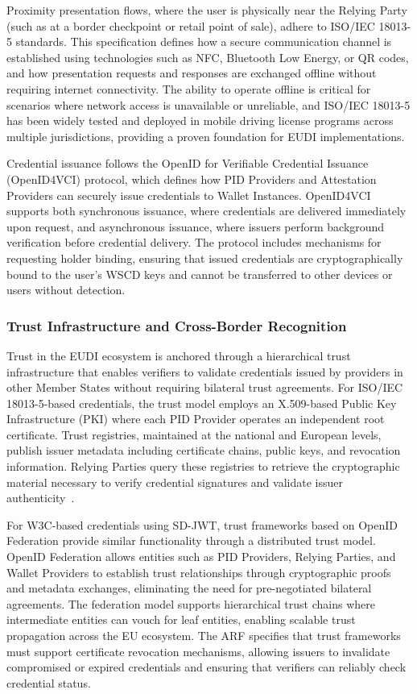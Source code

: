 \documentclass[sigconf,balance,nonacm,authordraft]{acmart}
\begin{document}
Proximity presentation flows, where the user is physically near the Relying Party (such as at a border checkpoint or retail point of sale), adhere to ISO/IEC 18013-5 standards. This specification defines how a secure communication channel is established using technologies such as NFC, Bluetooth Low Energy, or QR codes, and how presentation requests and responses are exchanged offline without requiring internet connectivity. The ability to operate offline is critical for scenarios where network access is unavailable or unreliable, and ISO/IEC 18013-5 has been widely tested and deployed in mobile driving license programs across multiple jurisdictions, providing a proven foundation for EUDI implementations.

Credential issuance follows the OpenID for Verifiable Credential Issuance (OpenID4VCI) protocol, which defines how PID Providers and Attestation Providers can securely issue credentials to Wallet Instances. OpenID4VCI supports both synchronous issuance, where credentials are delivered immediately upon request, and asynchronous issuance, where issuers perform background verification before credential delivery. The protocol includes mechanisms for requesting holder binding, ensuring that issued credentials are cryptographically bound to the user's WSCD keys and cannot be transferred to other devices or users without detection.

\subsubsection{Trust Infrastructure and Cross-Border Recognition}

Trust in the EUDI ecosystem is anchored through a hierarchical trust infrastructure that enables verifiers to validate credentials issued by providers in other Member States without requiring bilateral trust agreements. For ISO/IEC 18013-5-based credentials, the trust model employs an X.509-based Public Key Infrastructure (PKI) where each PID Provider operates an independent root certificate. Trust registries, maintained at the national and European levels, publish issuer metadata including certificate chains, public keys, and revocation information. Relying Parties query these registries to retrieve the cryptographic material necessary to verify credential signatures and validate issuer authenticity~\cite{PortoThesis,Finextra_SSI_Components}.

For W3C-based credentials using SD-JWT, trust frameworks based on OpenID Federation provide similar functionality through a distributed trust model. OpenID Federation allows entities such as PID Providers, Relying Parties, and Wallet Providers to establish trust relationships through cryptographic proofs and metadata exchanges, eliminating the need for pre-negotiated bilateral agreements. The federation model supports hierarchical trust chains where intermediate entities can vouch for leaf entities, enabling scalable trust propagation across the EU ecosystem. The ARF specifies that trust frameworks must support certificate revocation mechanisms, allowing issuers to invalidate compromised or expired credentials and ensuring that verifiers can reliably check credential status.
\end{document}
